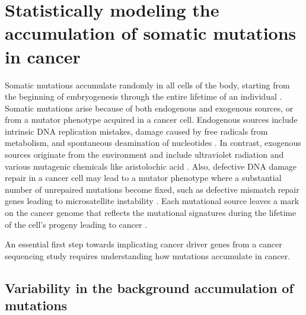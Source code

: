 
\chapter{Statistically modeling the accumulation of somatic mutations in cancer}
\label{chap:ch2}

Somatic mutations accumulate randomly in all cells of the body, starting from the beginning of embryogenesis through the entire lifetime of an individual \cite{RN63}. Somatic mutations arise because of both endogenous and exogenous sources, or from a mutator phenotype acquired in a cancer cell. Endogenous sources include intrinsic DNA replication mistakes, damage caused by free radicals from metabolism, and spontaneous deamination of nucleotides \cite{RN64}. In contrast, exogenous sources originate from the environment and include ultraviolet radiation \cite{RN64} and various mutagenic chemicals like aristolochic acid \cite{RN65}.  Also, defective DNA damage repair in a cancer cell may lead to a mutator phenotype where a substantial number of unrepaired mutations become fixed, such as defective mismatch repair genes leading to microsatellite instability \cite{RN68}. Each mutational source leaves a mark on the cancer genome that reflects the mutational signatures during the lifetime of the cell's progeny leading to cancer \cite{RN64}.

An essential first step towards implicating cancer driver genes from a cancer sequencing study requires understanding how mutations accumulate in cancer.

\section{Variability in the background accumulation of mutations}

